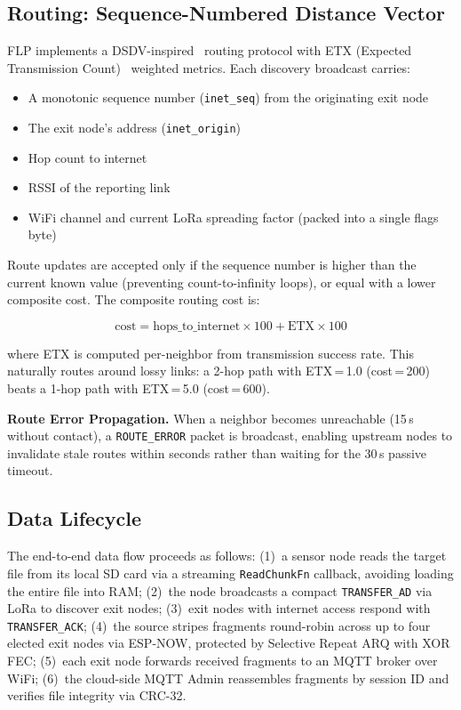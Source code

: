 \documentclass[conference]{IEEEtran}
\begin{document}
\subsection{Routing: Sequence-Numbered Distance Vector}
\label{sec:routing}

FLP implements a DSDV-inspired~\cite{perkins1994dsdv} routing protocol with ETX (Expected Transmission Count)~\cite{decouto2003etx} weighted metrics. Each discovery broadcast carries:

\begin{itemize}
  \item A monotonic sequence number (\texttt{inet\_seq}) from the originating exit node
  \item The exit node's address (\texttt{inet\_origin})
  \item Hop count to internet
  \item RSSI of the reporting link
  \item WiFi channel and current LoRa spreading factor (packed into a single flags byte)
\end{itemize}

Route updates are accepted only if the sequence number is higher than the current known value (preventing count-to-infinity loops), or equal with a lower composite cost. The composite routing cost is:

\begin{equation}
  \text{cost} = \text{hops\_to\_internet} \times 100 + \text{ETX} \times 100
\end{equation}

where ETX is computed per-neighbor from transmission success rate. This naturally routes around lossy links: a 2-hop path with ETX\,=\,1.0 (cost\,=\,200) beats a 1-hop path with ETX\,=\,5.0 (cost\,=\,600).

\textbf{Route Error Propagation.} When a neighbor becomes unreachable (15\,s without contact), a \texttt{ROUTE\_ERROR} packet is broadcast, enabling upstream nodes to invalidate stale routes within seconds rather than waiting for the 30\,s passive timeout.

\subsection{Data Lifecycle}

The end-to-end data flow proceeds as follows: (1)~a sensor node reads the target file from its local SD card via a streaming \texttt{ReadChunkFn} callback, avoiding loading the entire file into RAM; (2)~the node broadcasts a compact \texttt{TRANSFER\_AD} via LoRa to discover exit nodes; (3)~exit nodes with internet access respond with \texttt{TRANSFER\_ACK}; (4)~the source stripes fragments round-robin across up to four elected exit nodes via ESP-NOW, protected by Selective Repeat ARQ with XOR FEC; (5)~each exit node forwards received fragments to an MQTT broker over WiFi; (6)~the cloud-side MQTT Admin reassembles fragments by session ID and verifies file integrity via CRC-32.
\end{document}
